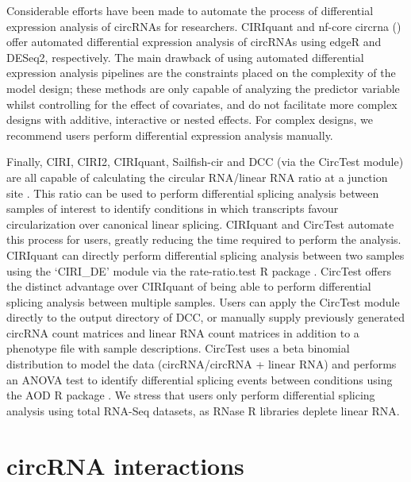 \documentclass[pdflatex,sn-mathphys-num]{sn-jnl}
\begin{document}
Considerable efforts have been made to automate the process of differential expression analysis of circRNAs for researchers. CIRIquant and nf-core circrna (\cite{CIRIquant,Digby2023Dec}) offer automated differential expression analysis of circRNAs using edgeR and DESeq2, respectively. The main drawback of using automated differential expression analysis pipelines are the constraints placed on the complexity of the model design; these methods are only capable of analyzing the predictor variable whilst controlling for the effect of covariates, and do not facilitate more complex designs with additive, interactive or nested effects. For complex designs, we recommend users perform differential expression analysis manually. \par
Finally, CIRI, CIRI2, CIRIquant, Sailfish-cir and DCC (via the CircTest module) are all capable of calculating the circular RNA/linear RNA ratio at a junction site \cite{CIRI, CIRI2, CIRIquant, DCC}. This ratio can be used to perform differential splicing analysis between samples of interest to identify conditions in which transcripts favour circularization over canonical linear splicing. CIRIquant and CircTest automate this process for users, greatly reducing the time required to perform the analysis. CIRIquant can directly perform differential splicing analysis between two samples using the `CIRI\_DE' module via the rate-ratio.test R package \cite{Fay2022May}. CircTest offers the distinct advantage over CIRIquant of being able to perform differential splicing analysis between multiple samples. Users can apply the CircTest module directly to the output directory of DCC, or manually supply previously generated circRNA count matrices and linear RNA count matrices in addition to a phenotype file with sample descriptions. CircTest uses a beta binomial distribution to model the data (circRNA/circRNA + linear RNA) and performs an ANOVA test to identify differential splicing events between conditions using the AOD R package \cite{Lancelot2022Apr}. We stress that users only perform differential splicing analysis using total RNA-Seq datasets, as RNase R libraries deplete linear RNA.
\section{circRNA interactions}
\end{document}

